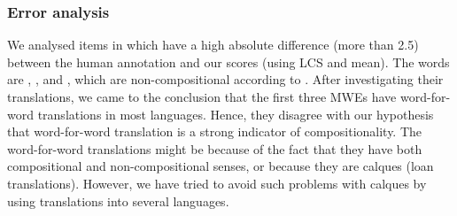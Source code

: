 \documentclass[output=paper,modfonts,nonflat]{langsci/langscibook}
\begin{document}

\subsubsection{Error analysis}
\label{sec:ss:erroranalysis}

We analysed items in \REDDY which have a high absolute difference (more than
2.5) between the human annotation and our scores (using LCS and
mean). The words are , ,
 and , which are
non-compositional according to \REDDY. After investigating their
translations, we came to the conclusion that the first three MWEs have
word-for-word translations in most languages. Hence, they disagree
with our hypothesis that word-for-word translation is a strong
indicator of compositionality.  The word-for-word translations might
be because of the fact that they have both compositional and
non-compositional senses, or because they are calques (loan
translations). However, we have tried to avoid such problems with
calques by using translations into several languages.
\end{document}
